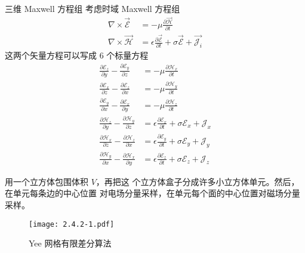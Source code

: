 \begin{definition}{三维 Maxwell 方程组}
    考虑时域 Maxwell 方程组
    \begin{align}
        \nabla \times \vec{\mathscr{E}} &= -\mu \frac{\partial \vec{\mathscr{H}}}{\partial t}\\
        \nabla \times \vec{\mathscr{H}} &= 
        \epsilon \frac{\partial \vec{\mathscr{E}}}{\partial t}
        +\sigma \vec{\mathscr{E}}
        +\vec{\mathscr{J}_i}
    \end{align}
    这两个矢量方程可以写成 6 个标量方程
    \begin{align}
        \label{Yee 三维 Maxwell 方程组-1}
        \frac{\partial \mathscr{E}_z}{\partial y}
        -\frac{\partial \mathscr{E}_y}{\partial z}
        &= -\mu \frac{\partial \mathscr{H}_x}{\partial t}\\
        \label{Yee 三维 Maxwell 方程组-2}
        \frac{\partial \mathscr{E}_x}{\partial z}
        -\frac{\partial \mathscr{E}_z}{\partial x}
        &= -\mu \frac{\partial \mathscr{H}_y}{\partial t}\\
        \label{Yee 三维 Maxwell 方程组-3}
        \frac{\partial \mathscr{E}_y}{\partial x}
        -\frac{\partial \mathscr{E}_x}{\partial y}
        &= -\mu \frac{\partial \mathscr{H}_z}{\partial t}\\
        \label{Yee 三维 Maxwell 方程组-4}
        \frac{\partial \mathscr{H}_z}{\partial y}
        -\frac{\partial \mathscr{H}_y}{\partial z}
        &= \epsilon \frac{\partial \mathscr{E}_x}{\partial t}
        +\sigma \mathscr{E}_x + \mathscr{J}_x\\
        \label{Yee 三维 Maxwell 方程组-5}
        \frac{\partial \mathscr{H}_x}{\partial z}
        -\frac{\partial \mathscr{H}_z}{\partial x}
        &= \epsilon \frac{\partial \mathscr{E}_y}{\partial t}
        +\sigma \mathscr{E}_y + \mathscr{J}_y\\
        \label{Yee 三维 Maxwell 方程组-6}
        \frac{\partial \mathscr{H}_y}{\partial x}
        -\frac{\partial \mathscr{H}_x}{\partial y}
        &= \epsilon \frac{\partial \mathscr{E}_z}{\partial t}
        +\sigma \mathscr{E}_z + \mathscr{J}_z
    \end{align}
\end{definition}

\par 用一个立方体包围体积 $V$，再把这
个立方体盒子分成许多小立方体单元。然后，在单元每条边的中心位置
对电场分量采样，在单元每个面的中心位置对磁场分量采样。

\begin{figure}[!htbp]
    \centering
    \texttt{[image: 2.4.2-1.pdf]}
    \caption{Yee 网格有限差分算法}
\end{figure}

